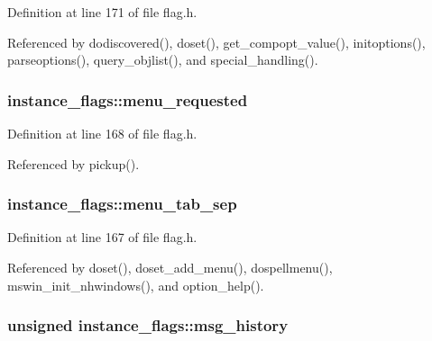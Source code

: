 Definition at line 171 of file flag.\+h.



Referenced by dodiscovered(), doset(), get\+\_\+compopt\+\_\+value(), initoptions(), parseoptions(), query\+\_\+objlist(), and special\+\_\+handling().

\hypertarget{structinstance__flags_acf15f814fa4282e40cd0a8798a59b0b2}{
\subsubsection[{menu\+\_\+requested}]{ instance\+\_\+flags\+::menu\+\_\+requested}}\label{structinstance__flags_acf15f814fa4282e40cd0a8798a59b0b2}


Definition at line 168 of file flag.\+h.



Referenced by pickup().

\hypertarget{structinstance__flags_a85c9a72818b89578114f16b9f26a95c0}{
\subsubsection[{menu\+\_\+tab\+\_\+sep}]{ instance\+\_\+flags\+::menu\+\_\+tab\+\_\+sep}}\label{structinstance__flags_a85c9a72818b89578114f16b9f26a95c0}


Definition at line 167 of file flag.\+h.



Referenced by doset(), doset\+\_\+add\+\_\+menu(), dospellmenu(), mswin\+\_\+init\+\_\+nhwindows(), and option\+\_\+help().

\hypertarget{structinstance__flags_adbf4e331046e9ace346e832fc8a59074}{
\subsubsection[{msg\+\_\+history}]{\setlength{\rightskip}{0pt plus 5cm}unsigned instance\+\_\+flags\+::msg\+\_\+history}}\label{structinstance__flags_adbf4e331046e9ace346e832fc8a59074}


